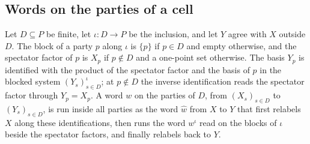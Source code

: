 \subsection{Words on the parties of a cell}
\label{sec:party_on_cell}

\begin{definition}
    \label{def:party_on_cell}
    \leanok
    Let $D\subseteq P$ be finite, let $\iota\colon D\to P$ be the inclusion, and let
    $Y$ agree with $X$ outside $D$. The block of a party $p$ along $\iota$ is $\{p\}$
    if $p\in D$ and empty otherwise, and the spectator factor of $p$ is $X_p$ if
    $p\notin D$ and a one-point set otherwise. The basis $Y_p$ is identified with the
    product of the spectator factor and the basis of $p$ in the blocked system
    $(Y_s)_{s\in D}^\iota$; at $p\notin D$ the inverse identification reads the
    spectator factor through $Y_p=X_p$. A word $w$ on the parties of $D$, from
    $(X_s)_{s\in D}$ to $(Y_s)_{s\in D}$, is run inside all parties as the word
    $\widehat w$ from $X$ to $Y$ that first relabels $X$ along these identifications,
    then runs the word $w^\iota$ read on the blocks of $\iota$ beside the spectator
    factors, and finally relabels back to $Y$.
\end{definition}

